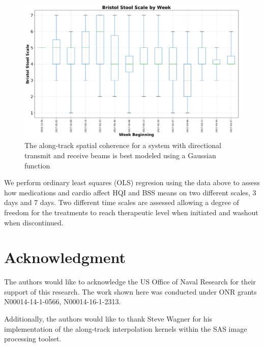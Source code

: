 \documentclass[conference]{IEEEtran}
\begin{document}
\begin{figure}[t]
    \centering
    \includegraphics[width=\columnwidth]{bss_box_whisker.png}
    \caption{The along-track spatial coherence for a system with directional transmit and receive beams is best modeled using a Gaussian function}\label{fig:abnormal_bss_whisker}
\end{figure}

We perform ordinary least squares (OLS) regresion using the data above to assess how medications and cardio affect HQI and BSS means on two different scales, 3 days and 7 days.  Two different time scales are assessed allowing a degree of freedom for the treatments to reach therapeutic level when initiated and washout when discontinued.



\section*{Acknowledgment}
The authors would like to acknowledge the US Office of Naval Research for their support of this research. The work shown here was conducted under ONR grants N00014-14-1-0566, N00014-16-1-2313.

Additionally, the authors would like to thank Steve Wagner for his implementation of the along-track interpolation kernels within the SAS image processing toolset.


\end{document}
